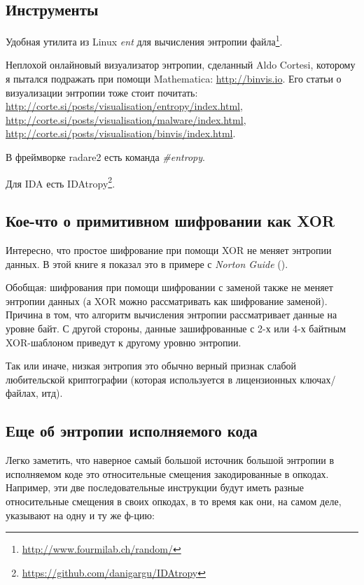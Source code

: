 \subsection{Инструменты}

Удобная утилита из Linux \emph{ent} для вычисления энтропии файла\footnote{\url{http://www.fourmilab.ch/random/}}.

Неплохой онлайновый визуализатор энтропии, сделанный Aldo Cortesi,
которому я пытался подражать при помощи Mathematica: \url{http://binvis.io}.
Его статьи о визуализации энтропии тоже стоит почитать:
\url{http://corte.si/posts/visualisation/entropy/index.html},
\url{http://corte.si/posts/visualisation/malware/index.html},
\url{http://corte.si/posts/visualisation/binvis/index.html}.

В фреймворке radare2 есть команда \emph{\#entropy}.

Для IDA есть IDAtropy\footnote{\url{https://github.com/danigargu/IDAtropy}}.

\subsection{Кое-что о примитивном шифровании как XOR}

Интересно, что простое шифрование при помощи XOR не меняет энтропии данных.
В этой книге я показал это в примере с \emph{Norton Guide} ().

Обобщая: шифрования при помощи шифровании с заменой также не меняет энтропии данных
(а XOR можно рассматривать как шифрование заменой).
Причина в том, что алгоритм вычисления энтропии рассматривает данные на уровне байт.
С другой стороны, данные зашифрованные с 2-х или 4-х байтным XOR-шаблоном приведут к другому уровню энтропии.

Так или иначе, низкая энтропия это обычно верный признак слабой любительской криптографии
(которая используется в лицензионных ключах/файлах, итд).

\subsection{Еще об энтропии исполняемого кода}

Легко заметить, что наверное самый большой источник большой энтропии в исполняемом коде это
относительные смещения закодированные в опкодах.
Например, эти две последовательные инструкции будут иметь разные относительные смещения в своих опкодах,
в то время как они, на самом деле, указывают на одну и ту же ф-цию:

